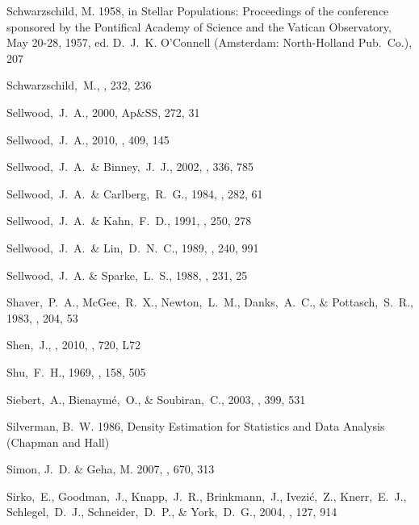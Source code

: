 \begin{thebibliography}{99}
{Schwarzschild}, M. 1958, in {Stellar Populations: Proceedings of the
  conference sponsored by the Pontifical Academy of Science and the Vatican
  Observatory, May 20-28, 1957}, ed. D.~J.~K. {O'Connell} ({Amsterdam}:
  {North-Holland Pub.~Co.}), 207

  Schwarzschild,~M.,
  \apj, 232, 236

  Sellwood,~J.~A., 2000,
  Ap\&SS, 272, 31

  Sellwood,~J.~A., 2010,
  \mnras, 409, 145

  Sellwood,~J.~A.~\& Binney,~J.~J., 2002,
  \mnras, 336, 785

  Sellwood,~J.~A.~\& Carlberg,~R.~G., 1984,
  \apj, 282, 61

  Sellwood,~J.~A.~\& Kahn,~F.~D., 1991,
  \mnras, 250, 278

  Sellwood,~J.~A.~\& Lin,~D.~N.~C., 1989,
  \mnras, 240, 991

  Sellwood,~J.~A. \& Sparke,~L.~S., 1988,
  \mnras, 231, 25

  Shaver,~P.~A., McGee,~R.~X., Newton,~L.~M., Danks,~A.~C., \& Pottasch,~S.~R., 1983,
  \mnras, 204, 53

  Shen,~J., \etal, 2010, \apj, 720, L72

  Shu,~F.~H., 1969,
  \apj, 158, 505

  Siebert,~A., Bienaym\'{e},~O., \& Soubiran,~C., 2003, \aap, 399, 531

{Silverman}, B.~W. 1986, {Density Estimation for Statistics and Data Analysis}
  ({Chapman and Hall})


{Simon}, J.~D. \& {Geha}, M. 2007, \apj, 670, 313

 Sirko,~E., Goodman,~J., Knapp,~J.~R., Brinkmann,~J., Ivezi\'{c},~Z., Knerr,~E.~J., Schlegel,~D.~J., Schneider,~D.~P., \& York,~D.~G., 2004,
  \aj, 127, 914


\end{thebibliography}
